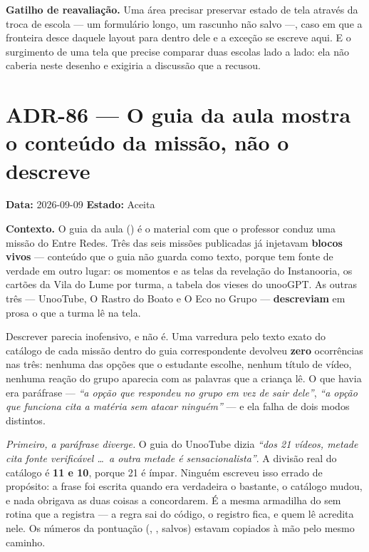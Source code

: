 \textbf{Gatilho de reavaliação.} Uma área precisar preservar estado de tela
através da troca de escola --- um formulário longo, um rascunho não salvo ---,
caso em que a fronteira desce daquele layout para dentro dele e a exceção se
escreve aqui. E o surgimento de uma tela que precise comparar duas escolas lado
a lado: ela não caberia neste desenho e exigiria a discussão que a 
recusou.


\section{ADR-86 --- O guia da aula \textbf{mostra} o conteúdo da missão, não o descreve}

\textbf{Data:} 2026-09-09 \quad \textbf{Estado:} Aceita

\textbf{Contexto.} O guia da aula () é o material com que o
professor conduz uma missão do Entre Redes. Três das seis missões publicadas já
injetavam \textbf{blocos vivos} --- conteúdo que o guia não guarda como texto,
porque tem fonte de verdade em outro lugar: os momentos e as telas da revelação
do Instanooria, os cartões da Vila do Lume por turma, a tabela dos vieses do
unooGPT. As outras três --- UnooTube, O Rastro do Boato e O Eco no Grupo ---
\textbf{descreviam} em prosa o que a turma lê na tela.

Descrever parecia inofensivo, e não é. Uma varredura pelo texto exato do
catálogo de cada missão dentro do guia correspondente devolveu \textbf{zero}
ocorrências nas três: nenhuma das opções que o estudante escolhe, nenhum título
de vídeo, nenhuma reação do grupo aparecia com as palavras que a criança lê. O
que havia era paráfrase --- \emph{``a opção que respondeu no grupo em vez de
sair dele''}, \emph{``a opção que funciona cita a matéria sem atacar
ninguém''} --- e ela falha de dois modos distintos.

\emph{Primeiro, a paráfrase diverge.} O guia do UnooTube dizia \emph{``dos 21
vídeos, metade cita fonte verificável \dots\ a outra metade é
sensacionalista''}. A divisão real do catálogo é \textbf{11 e 10}, porque 21 é
ímpar. Ninguém escreveu isso errado de propósito: a frase foi escrita quando era
verdadeira o bastante, o catálogo mudou, e nada obrigava as duas coisas a
concordarem. É a mesma armadilha do  sem rotina que a
 registra --- a regra sai do código, o registro fica, e quem lê
acredita nele. Os números da pontuação (, ,  salvos)
estavam copiados à mão pelo mesmo caminho.

